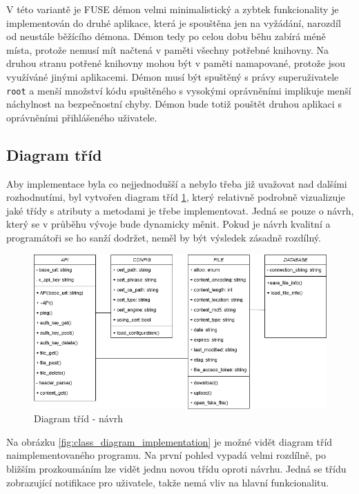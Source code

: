 V této variantě je FUSE démon velmi minimalistický a zybtek funkcionality je implementován do druhé aplikace, která je spouštěna jen na vyžádání, narozdíl od neustále
běžícího démona. Démon tedy po celou dobu běhu zabírá méně místa, protože nemusí mít načtená v paměti všechny potřebné knihovny. Na druhou stranu potřené knihovny mohou 
být v paměti namapované, protože jsou využíváné jinými aplikacemi. Démon musí být spuštěný s právy superuživatele \texttt{root} a menší množství kódu spuštěného s vysokými
oprávněními implikuje menší náchylnost na bezpečnostní chyby. Démon bude totiž pouštět druhou aplikaci s oprávněními přihlášeného uživatele.

\subsection{Diagram tříd}

Aby implementace byla co nejjednodušší a nebylo třeba již uvažovat nad dalšími rozhodnutími, byl vytvořen diagram tříd \ref{fig:class_diagram_design}, který relativně
podrobně vizualizuje jaké třídy s atributy a metodami je třebe implementovat. Jedná se pouze o návrh, který se v průběhu vývoje bude dynamicky měnit. Pokud je návrh
kvalitní a programátoři se ho sanží dodržet, neměl by být výsledek zásadně rozdílný.

\begin{figure}[h]
    \centering
    \includegraphics[width=1\linewidth]{other-fig/class_diagram_design.png}
    \caption{Diagram tříd - návrh}
    \label{fig:class_diagram_design}
\end{figure}

Na obrázku \ref{fig:class_diagram_implementation} je možné vidět diagram tříd naimplementovaného programu. Na první pohled vypadá velmi rozdílně, po bližším prozkoumáním
lze vidět jednu novou třídu oproti návrhu. Jedná se třídu zobrazující notifikace pro uživatele, takže nemá vliv na hlavní funkcionalitu.

